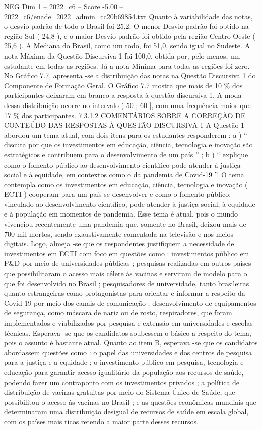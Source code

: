 \begin{textsample}{NEG Dim 1 – 2022\_c6 – Score -5.00 – 2022\_c6/enade\_2022\_admin\_cc20b69854.txt}
Quanto à variabilidade das notas, o desvio-padrão de todo o Brasil foi 25,2.
O menor Desvio-padrão foi obtido na região Sul ( 24,8 ), e o maior Desvio-padrão foi obtido pela região Centro-Oeste ( 25,6 ).
A Mediana do Brasil, como um todo, foi 51,0, sendo igual no Sudeste.
A nota Máxima da Questão Discursiva 1 foi 100,0, obtida por, pelo menos, um estudante em todas as regiões.
Já a nota Mínima para todas as regiões foi zero.
No Gráfico 7.7, apresenta -se a distribuição das notas na Questão Discursiva 1 do Componente de Formação Geral.
O Gráfico 7.7 mostra que mais de 10 \% dos participantes deixaram em branco a resposta à questão discursiva 1.
A moda dessa distribuição ocorre no intervalo ( 50 ; 60 ], com uma frequência maior que 17 \% dos participantes. 7.3.1.2 COMENTÁRIOS SOBRE A CORREÇÃO DE CONTEÚDO DAS RESPOSTAS À QUESTÃO DISCURSIVA 1 A Questão 1 abordou um tema atual, com dois itens para os estudantes responderem : a ) “ discuta por que os investimentos em educação, ciência, tecnologia e inovação são estratégicos e contribuem para o desenvolvimento de um país ” ; b ) “ explique como o fomento público ao desenvolvimento científico pode atender à justiça social e à equidade, em contextos como o da pandemia de Covid-19 ”.
O tema contempla como os investimentos em educação, ciência, tecnologia e inovação ( ECTI ) cooperam para um país se desenvolver e como o fomento público, vinculado ao desenvolvimento científico, pode atender à justiça social, à equidade e à população em momentos de pandemia.
Esse tema é atual, pois o mundo vivenciou recentemente uma pandemia que, somente no Brasil, deixou mais de 700 mil mortos, sendo exaustivamente comentada na televisão e nos meios digitais.
Logo, almeja -se que os respondentes justifiquem a necessidade de investimentos em ECTI com foco em questões como : investimentos público em P\&D por meio de universidades públicas ; pesquisas realizadas em outros países que possibilitaram o acesso mais célere às vacinas e serviram de modelo para o que foi desenvolvido no Brasil ; pesquisadores de universidade, tanto brasileiras quanto estrangeiras como protagonistas para orientar e informar a respeito da Covid-19 por meio dos canais de comunicação ; desenvolvimento de equipamentos de segurança, como máscara de nariz ou de rosto, respiradores, que foram implementados e viabilizados por pesquisa e extensão em universidades e escolas técnicas.
Esperava -se que os candidatos soubessem o básico a respeito do tema, pois o assunto é bastante atual.
Quanto ao item B, esperava -se que os candidatos abordassem questões como : o papel das universidades e dos centros de pesquisa para a justiça e a equidade ; o investimento público em pesquisa, tecnologia e educação para garantir acesso igualitário da população aos recursos de saúde, podendo fazer um contraponto com os investimentos privados ; a política de distribuição de vacinas gratuitas por meio do Sistema Único de Saúde, que possibilitou o acesso às vacinas no Brasil ; e as questões econômicas mundiais que determinaram uma distribuição desigual de recursos de saúde em escala global, com os países mais ricos retendo a maior parte desses recursos.

\end{textsample}
